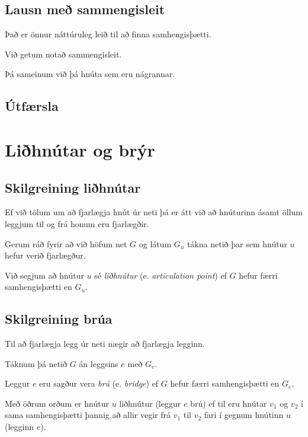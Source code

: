 \subsection{Lausn með sammengisleit}
{
    {
        \item<1-> Það er önnur náttúruleg leið til að finna samhengisþætti.
        \item<2-> Við getum notað sammengisleit.
        \item<3-> Þá sameinum við þá hnúta sem eru nágrannar.
    }
}

\subsection{Útfærsla}
{
}

\section{Liðhnútar og brýr}
\subsection{Skilgreining liðhnútar}
{
    {
        \item<1-> Ef við tölum um að fjarlægja hnút úr neti þá er átt við að hnúturinn ásamt öllum leggjum til og frá honum eru fjarlægðir.
        \item<2-> Gerum ráð fyrir að við höfum net $G$ og látum $G_u$ tákna netið þar sem hnútur $u$ hefur verið fjarlægður.
        \item<3-> Við segjum að hnútur $u$ sé \emph{liðhnútur} (e. \emph{articulation point}) ef $G$ hefur færri samhengisþætti en $G_u$.
    }
}

\subsection{Skilgreining brúa}
{
    {
        \item<1-> Til að fjarlægja legg úr neti nægir að fjarlægja legginn.
        \item<2-> Táknum þá netið $G$ án leggsins $e$ með $G_e$.
        \item<3-> Leggur $e$ eru sagður vera \emph{brú} (e. \emph{bridge}) ef $G$ hefur færri samhengisþætti en $G_e$.
        \item<4-> Með öðrum orðum er hnútur $u$ liðhnútur (leggur $e$ brú) ef til eru hnútar $v_1$ og $v_2$ í sama samhengisþætti
                    þannig að allir vegir frá $v_1$ til $v_2$ fari í gegnum hnútinn $u$ (legginn $e$).
    }
}


